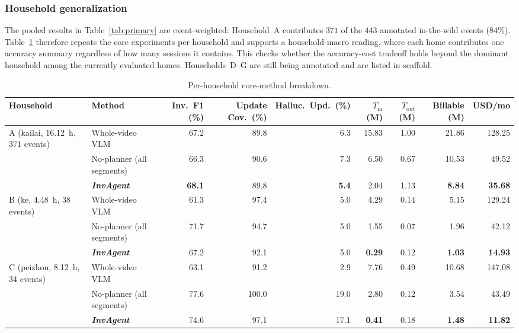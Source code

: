 \documentclass[sigconf,anonymous,nonacm]{acmart}
\newcommand{\sys}{\textit{InvAgent}\xspace}
\begin{document}
\subsubsection{Household generalization}

The pooled results in Table~\ref{tab:primary} are event-weighted:
Household~A contributes $371$ of the $443$ annotated in-the-wild
events ($84\%$). Table~\ref{tab:household-generalization} therefore
repeats the core experiments per household and supports a
household-macro reading, where each home contributes one accuracy
summary regardless of how many sessions it contains. This checks
whether the accuracy-cost tradeoff holds beyond the dominant household
among the currently evaluated homes. Households~D--G are still being
annotated and are listed in scaffold.

\begin{table}[t]
\centering
\small
\setlength{\tabcolsep}{4pt}
\caption{Per-household core-method breakdown.}
\label{tab:household-generalization}
\begin{tabular}{llrrrrrrr}
\toprule
Household & Method & Inv.~F1 (\%) & Update Cov.~(\%) & Halluc.~Upd.~(\%) & $T_{\mathrm{in}}$ (M) & $T_{\mathrm{out}}$ (M) & Billable (M) & USD/mo \\
\midrule
A (kailai, 16.12~h, 371 events)
  & Whole-video VLM      & 67.2 & 89.8 & 6.3 & 15.83 & 1.00 & 21.86 & 128.25 \\
  & No-planner (all segments) & 66.3 & 90.6 & 7.3 &  6.50 & 0.67 & 10.53 & 49.52 \\
  & \textbf{\sys}      & \textbf{68.1} & 89.8 & \textbf{5.4} &  2.04 & 1.13 & \textbf{8.84} & \textbf{35.68} \\
\midrule
B (ke, 4.48~h, 38 events)
  & Whole-video VLM      & 61.3 & 97.4 & 5.0 &  4.29 & 0.14 &  5.15 & 129.24 \\
  & No-planner (all segments) & 71.7 & 94.7 & 5.0 &  1.55 & 0.07 &  1.96 & 42.12 \\
  & \textbf{\sys}      & 67.2 & 92.1 & 5.0 &  \textbf{0.29} & 0.12 & \textbf{1.03} & \textbf{14.93} \\
\midrule
C (peizhou, 8.12~h, 34 events)
  & Whole-video VLM      & 63.1 & 91.2 & 2.9 &  7.76 & 0.49 & 10.68 & 147.08 \\
  & No-planner (all segments) & 77.6 & 100.0 & 19.0 &  2.80 & 0.12 &  3.54 & 43.49 \\
  & \textbf{\sys}      & 74.6 & 97.1 & 17.1 &  \textbf{0.41} & 0.18 & \textbf{1.48} & \textbf{11.82} \\
\midrule

\end{tabular}
\end{table}
\end{document}
